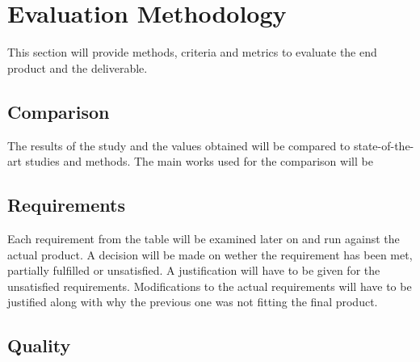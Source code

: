 
\section{Evaluation Methodology}

This section will provide methods, criteria and metrics to evaluate the end product and the deliverable.


\subsection{Comparison}

The results of the study and the values obtained will be compared to state-of-the-art studies and methods. The main works used for the comparison will be \cite{}


\subsection{Requirements}

Each requirement from the table will be examined later on and run against the actual product. A decision will be made on wether the requirement has been met, partially fulfilled or unsatisfied. A justification will have to be given for the unsatisfied requirements. Modifications to the actual requirements will have to be justified along with why the previous one was not fitting the final product.


\subsection{Quality}

